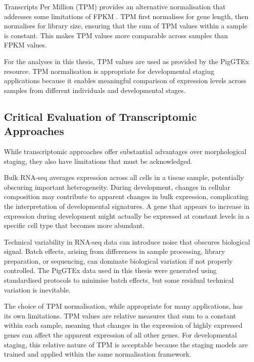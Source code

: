 Transcripts Per Million (TPM) provides an alternative normalisation that addresses some limitations of FPKM \parencite{zhao_tpm_2021}. TPM first normalises for gene length, then normalises for library size, ensuring that the sum of TPM values within a sample is constant. This makes TPM values more comparable across samples than FPKM values.

For the analyses in this thesis, TPM values are used as provided by the PigGTEx resource. TPM normalisation is appropriate for developmental staging applications because it enables meaningful comparison of expression levels across samples from different individuals and developmental stages.

\subsection{Critical Evaluation of Transcriptomic Approaches}

While transcriptomic approaches offer substantial advantages over morphological staging, they also have limitations that must be acknowledged.

Bulk RNA-seq averages expression across all cells in a tissue sample, potentially obscuring important heterogeneity. During development, changes in cellular composition may contribute to apparent changes in bulk expression, complicating the interpretation of developmental signatures. A gene that appears to increase in expression during development might actually be expressed at constant levels in a specific cell type that becomes more abundant.

Technical variability in RNA-seq data can introduce noise that obscures biological signal. Batch effects, arising from differences in sample processing, library preparation, or sequencing, can dominate biological variation if not properly controlled. The PigGTEx data used in this thesis were generated using standardised protocols to minimise batch effects, but some residual technical variation is inevitable.

The choice of TPM normalisation, while appropriate for many applications, has its own limitations. TPM values are relative measures that sum to a constant within each sample, meaning that changes in the expression of highly expressed genes can affect the apparent expression of all other genes. For developmental staging, this relative nature of TPM is acceptable because the staging models are trained and applied within the same normalisation framework.

